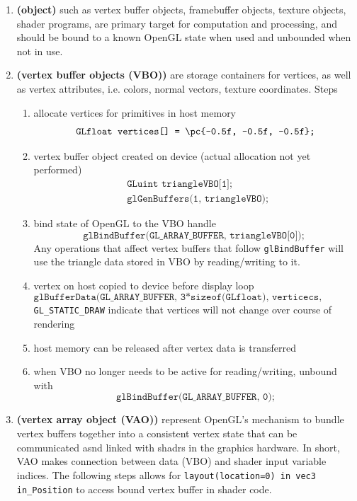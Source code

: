 \documentclass[11pt]{article}
\newcommand{\bheading}[1]{\textbf{(#1)}}
\begin{document}
\begin{enumerate}
    \item \bheading{object} such as vertex buffer objects, framebuffer objects, texture objects, shader programs, are primary target for computation and processing, and should be bound to a known OpenGL state when used and unbounded when not in use.
    \item \bheading{vertex buffer objects (VBO)} are storage containers for vertices, as well as vertex attributes, i.e. colors, normal vectors, texture coordinates. Steps
    \begin{enumerate}
        \item allocate vertices for primitives in host memory
        \[
            \texttt{GLfloat vertices[] = \pc{-0.5f, -0.5f, -0.5f};}
        \]
        \item vertex buffer object created on device (actual allocation not yet performed)
        \begin{align*}
            &\texttt{GLuint triangleVBO[1];} \\
            &\texttt{glGenBuffers(1, triangleVBO); }
        \end{align*}
        \item bind state of OpenGL to the VBO handle
        \[
            \texttt{glBindBuffer(GL\_ARRAY\_BUFFER, triangleVBO[0]); }
        \]
        Any operations that affect vertex buffers that follow \texttt{glBindBuffer} will use the triangle data stored in VBO by reading/writing to it.
        \item vertex on host copied to device before display loop
        \[
            \texttt{glBufferData(GL\_ARRAY\_BUFFER, 3*sizeof(GLfloat), verticecs, GL\_STATIC\_DRAW);}
        \]
        \texttt{GL\_STATIC\_DRAW} indicate that vertices will not change over course of rendering
        \item host memory can be released after vertex data is transferred
        \item when VBO no longer needs to be active for reading/writing, unbound with 
        \[
            \texttt{glBindBuffer(GL\_ARRAY\_BUFFER, 0);}
        \]
    \end{enumerate}
    \item \bheading{vertex array object (VAO)} represent OpenGL's mechanism to bundle vertex buffers together into a consistent vertex state that can be communicated asnd linked with shadrs in the graphics hardware. In short, VAO makes connection between data (VBO) and shader input variable indices. The following steps allows for \texttt{layout(location=0) in vec3 in\_Position} to access bound vertex buffer in shader code.

\end{enumerate}
\end{document}
